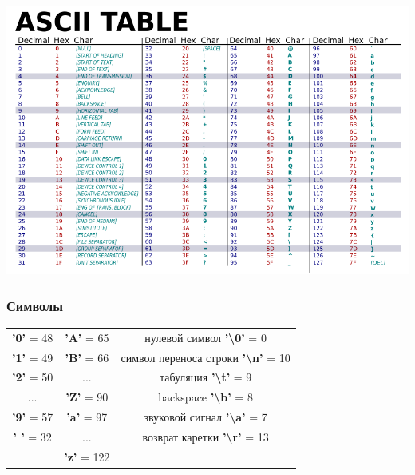 \documentclass[12pt,pdf,hyperref={unicode}]{beamer}
\begin{document}
\begin{frame}[fragile]
\begin{center}
\includegraphics[width=1.05\linewidth]{images/ascii.png}
\end{center}
\end{frame}

\begin{frame}[fragile]
\frametitle{Символы}
\begin{center}
\begin{tabular}{ c | c | c }
  {\color{red}\textbf{'0'}} = 48 & {\color{red}\textbf{'A'}} = 65 & нулевой символ  {\color{red}\textbf{'\textbackslash 0'}} = 0 \\
  {\color{red}\textbf{'1'}} = 49 & {\color{red}\textbf{'B'}} = 66 & символ переноса строки {\color{red}\textbf{'\textbackslash n'}} = 10 \\
  {\color{red}\textbf{'2'}} = 50 & ...                             & табуляция {\color{red}\textbf{'\textbackslash t'}} = 9 \\
  ...                            & {\color{red}\textbf{'Z'}} = 90 & backspace {\color{red}\textbf{'\textbackslash b'}} = 8 \\
  {\color{red}\textbf{'9'}} = 57 & {\color{red}\textbf{'a'}} = 97 & звуковой сигнал {\color{red}\textbf{'\textbackslash a'}} = 7 \\
  {\color{red}\textbf{' '}} = 32 & ...                           & возврат каретки {\color{red}\textbf{'\textbackslash r'}} = 13 \\
                                 & {\color{red}\textbf{'z'}} = 122  &   \\
\end{tabular}
\end{center}
\end{frame}
\end{document}
